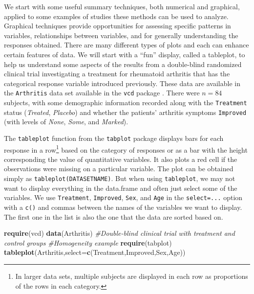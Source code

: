 \documentclass[]{book}
\newenvironment{Shaded}{\begin{snugshade}}{\end{snugshade}}
\newcommand{\KeywordTok}[1]{\textcolor[rgb]{0.13,0.29,0.53}{\textbf{#1}}}
\newcommand{\DataTypeTok}[1]{\textcolor[rgb]{0.13,0.29,0.53}{#1}}
\newcommand{\CommentTok}[1]{\textcolor[rgb]{0.56,0.35,0.01}{\textit{#1}}}
\newcommand{\NormalTok}[1]{#1}
\let\rmarkdownfootnote\footnote%
\def\footnote{\protect\rmarkdownfootnote}
\theoremstyle{definition}
\theoremstyle{definition}
\theoremstyle{remark}
\begin{document}
We start with some useful summary techniques, both numerical and
graphical, applied to some examples of studies these methods can be used
to analyze. Graphical techniques provide opportunities for assessing
specific patterns in variables, relationships between variables, and for
generally understanding the responses obtained. There are many different
types of plots and each can enhance certain features of data. We will
start with a ``fun'' display, called a tableplot, to help us understand
some aspects of the results from a double-blind randomized clinical
trial investigating a treatment for rheumatoid arthritis that has the
categorical response variable introduced previously. These data are
available in the \texttt{Arthritis} data set available in the
\texttt{vcd} package \citep{R-vcd}. There were \(n=84\) subjects, with
some demographic information recorded along with the \texttt{Treatment}
status (\emph{Treated}, \emph{Placebo}) and whether the patients'
arthritis symptoms \texttt{Improved} (with levels of \emph{None},
\emph{Some}, and \emph{Marked}).

The \texttt{tableplot} function from the \texttt{tabplot} package
\citep{R-tabplot} displays bars for each response in a row\footnote{In
  larger data sets, multiple subjects are displayed in each row as
  proportions of the rows in each category.} based on the category of
responses or as a bar with the height corresponding the value of
quantitative variables. It also plots a red cell if the observations
were missing on a particular variable. The plot can be obtained simply
as \texttt{tableplot(DATASETNAME)}. But when using \texttt{tableplot},
we may not want to display everything in the data.frame and often just
select some of the variables. We use \texttt{Treatment},
\texttt{Improved}, \texttt{Sex}, and \texttt{Age} in the
\texttt{select=...} option with a \texttt{c()} and commas between the
names of the variables we want to display. The first one in the list is
also the one that the data are sorted based on.



\begin{Shaded}
\begin{Highlighting}[]
\KeywordTok{require}\NormalTok{(vcd)}
\KeywordTok{data}\NormalTok{(Arthritis) }\CommentTok{#Double-blind clinical trial with treatment and control groups}
\CommentTok{#Homogeneity example}
\KeywordTok{require}\NormalTok{(tabplot)}
\KeywordTok{tableplot}\NormalTok{(Arthritis,}\DataTypeTok{select=}\KeywordTok{c}\NormalTok{(Treatment,Improved,Sex,Age))}
\end{Highlighting}
\end{Shaded}
\end{document}
